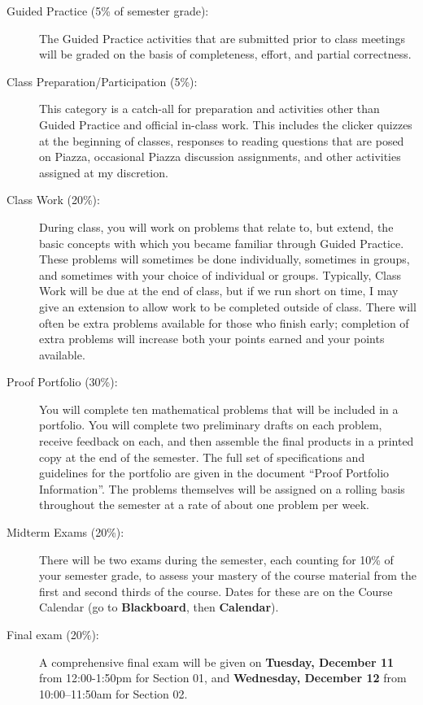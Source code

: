 \documentclass[11pt]{article}
\begin{document}
\begin{description}
	\item[Guided Practice (5\% of semester grade):] The Guided Practice activities that are submitted prior to class meetings will be graded on the basis of completeness, effort, and partial correctness. 
	\item[Class Preparation/Participation (5\%):] This category is a catch-all for preparation and activities other than Guided Practice and official in-class work. This includes the clicker quizzes at the beginning of classes, responses to reading questions that are posed on Piazza, occasional Piazza discussion assignments, and other activities assigned at my discretion. 
	\item[Class Work (20\%):] During class, you will work on problems that relate to, but extend, the basic concepts with which you became familiar through Guided Practice. These problems will sometimes be done individually, sometimes in groups, and sometimes with your choice of individual or groups. Typically, Class Work will be due at the end of class, but if we run short on time, I may give an extension to allow work to be completed outside of class. There will often be extra problems available for those who finish early; completion of extra problems will increase both your points earned and your points available.
	\item[Proof Portfolio (30\%):] You will complete ten mathematical problems that will be included in a portfolio. You will complete two preliminary drafts on each problem, receive feedback on each, and then assemble the final products in a printed copy at the end of the semester. The full set of specifications and guidelines for the portfolio are given in the document ``Proof Portfolio Information''. The problems themselves will be assigned on a rolling basis throughout the semester at a rate of about one problem per week. 
	\item[Midterm Exams (20\%):] There will be two exams during the semester, each counting for 10\% of your semester grade, to assess your mastery of the course material from the first and second thirds of the course. Dates for these are on the Course Calendar (go to \textbf{Blackboard}, then \textbf{Calendar}). 
	\item[Final exam (20\%):] A comprehensive final exam will be given on \textbf{Tuesday, December 11} from 12:00-1:50pm for Section 01, and \textbf{Wednesday, December 12} from 10:00--11:50am for Section 02. 
\end{description}
\end{document}
